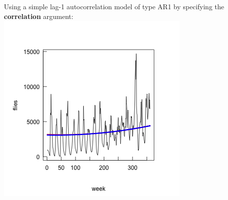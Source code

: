 \documentclass{beamer}
\begin{document}
\begin{frame}[fragile]
\begin{columns}
\begin{column}{0.63\textwidth}
      \end{column}
      \begin{column}{0.37\textwidth}
      Using a simple lag-1 autocorrelation model of type AR1 by specifying the \textbf{correlation} argument:
      \includegraphics[width=\textwidth]{lectures/day_4_GLS/figures/unnamed-chunk-21-1.png}
      \end{column}
  \end{columns}
\end{frame}
\end{document}
